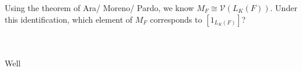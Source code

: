 Using the theorem of Ara/ Moreno/ Pardo, we know $M_F\cong\mathcal{V}(L_K(F))$. Under this
identification, which element of $M_F$ corresponds to $[1_{L_K(F)}]$?\\\\

\begin{solution}\renewcommand{\qedsymbol}{}\ \\
    Well
\end{solution}